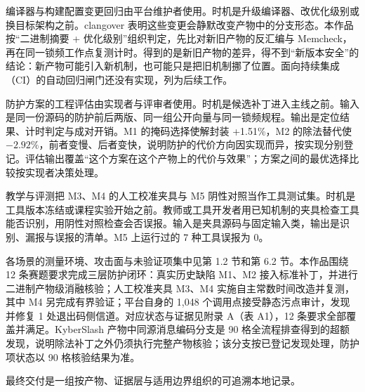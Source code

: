 编译器与构建配置变更回归由平台维护者使用。时机是升级编译器、改优化级别或换目标架构之前。clangover 表明这些变更会静默改变产物中的分支形态\cite{clangover}。本作品按“二进制摘要 + 优化级别”组织判定，先比对新旧产物的反汇编与 Memcheck，再在同一锁频工作点复测计时。得到的是新旧产物的差异，得不到“新版本安全”的结论：新产物可能引入新机制，也可能只是把旧机制挪了位置。面向持续集成（CI）的自动回归闸门还没有实现，列为后续工作。

防护方案的工程评估由实现者与评审者使用。时机是候选补丁进入主线之前。输入是同一份源码的防护前后两版、同一组公开向量与同一锁频规程。输出是定位结果、计时判定与成对开销。M1 的掩码选择使解封装 +1.51\%，M2 的除法替代使 $-2.92\%$，前者变慢、后者变快，说明防护的代价方向因实现而异，按实现分别登记。评估输出覆盖“这个方案在这个产物上的代价与效果”；方案之间的最优选择比较按实现者决策处理。%

教学与评测把 M3、M4 的人工校准夹具与 M5 阴性对照当作工具测试集。时机是工具版本冻结或课程实验开始之前。教师或工具开发者用已知机制的夹具检查工具能否识别，用阴性对照检查会否误报。输入是夹具源码与固定输入类，输出是识别、漏报与误报的清单。M5 上运行过的 7 种工具误报为 0。%

各场景的测量环境、攻击面与未验证项集中见第 1.2 节和第 6.2 节。本作品围绕 12 条赛题要求完成三层防护闭环：真实历史缺陷 M1、M2 接入标准补丁，并进行二进制产物级消融核验；人工校准夹具 M3、M4 实施自主常数时间改造并复测，其中 M4 另完成有界验证；平台自身的 1,048 个调用点接受静态污点审计，发现并修复 1 处退出码侧信道。对应状态与证据见附录 A（表 A1），12 条要求全部覆盖并满足。KyberSlash 产物中同源消息编码分支是 90 格全流程排查得到的超额发现，说明除法补丁之外仍须执行完整产物核验；该分支按已登记发现处理，防护项状态以 90 格核验结果为准。%

最终交付是一组按产物、证据层与适用边界组织的可追溯本地记录。
